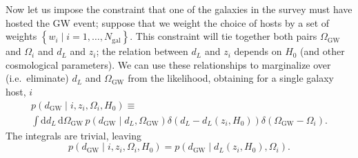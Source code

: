 \documentclass[modern]{aastex62}
\newcommand{\dd}{\mathrm{d}}
\newcommand{\dEM}{d_{\mathrm{EM}}}
\newcommand{\dGW}{d_{\mathrm{GW}}}
\newcommand{\Ngal}{N_{\mathrm{gal}}}
\newcommand{\OGW}{\Omega_{\mathrm{GW}}}
\begin{document}
Now let us impose the constraint that one of the galaxies in the survey must
have hosted the \ac{GW} event; suppose that we weight the choice of hosts by a
set of weights $\left\{ w_i \mid i = 1, \ldots, \Ngal \right\}$.  This
constraint will tie together both pairs $\OGW$ and $\Omega_i$ and $d_L$ and
$z_i$; the relation between $d_L$ and $z_i$ depends on $H_0$ (and other
cosmological parameters).  We can use these relationships to marginalize over
(i.e.\ eliminate) $d_L$ and $\OGW$ from the likelihood, obtaining for a single
galaxy host, $i$
%
%
%
\begin{multline}
    p\left( \dGW \mid i, z_i, \Omega_i, H_0 \right) \equiv \\ \int \dd d_L \, \dd \OGW \, p\left( \dGW \mid d_L, \OGW \right)  \delta\left( d_L - d_L\left( z_i, H_0 \right) \right) \delta \left( \OGW - \Omega_i \right).
\end{multline}
%
The integrals are trivial, leaving
%
\begin{equation}
    p\left( \dGW \mid i, z_i, \Omega_i, H_0 \right) = p\left( \dGW \mid d_L\left( z_i, H_0 \right), \Omega_i \right).
\end{equation}
\end{document}
